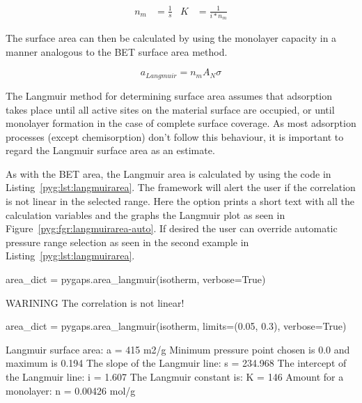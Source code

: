 \begin{align}
	n_m & = \frac{1}{s} & K & = \frac{1}{i * n_m}
\end{align}

The surface area can then be calculated by using the monolayer
capacity in a manner analogous to the BET surface area method.

\begin{equation}
	a_{Langmuir} = n_m A_N \sigma
\end{equation}

The Langmuir method for determining surface area assumes that
adsorption takes place until all active sites on the material
surface are occupied, or until monolayer formation in the
case of complete surface coverage. As most adsorption processes
(except chemisorption) don't follow this behaviour, it is
important to regard the Langmuir surface area as an estimate.

As with the BET area, the Langmuir area is calculated by using the code in
Listing~\ref{pyg:lst:langmuirarea}. The framework will alert the user
if the correlation is not linear in the selected range.
Here the  option prints a short
text with all the calculation variables and the graphs the
Langmuir plot as seen in Figure~\ref{pyg:fgr:langmuirarea-auto}.
If desired the user can override
automatic pressure range selection as seen in the second example in
Listing~\ref{pyg:lst:langmuirarea}.

\begin{samepage}
	\begin{python}[caption={Calculating a Langmuir area},label={pyg:lst:langmuirarea}]
area_dict = pygaps.area_langmuir(isotherm, verbose=True)
\end{python}
	\begin{pythonout}
WARINING The correlation is not linear!
\end{pythonout}
	\begin{python}
area_dict = pygaps.area_langmuir(isotherm, 
                                 limits=(0.05, 0.3), 
                                 verbose=True)
\end{python}
	\begin{pythonout}
Langmuir surface area: 	a = 415 m2/g
Minimum pressure point chosen is 0.0 and maximum is 0.194
The slope of the Langmuir line: 		s = 234.968
The intercept of the Langmuir line: 	i = 1.607
The Langmuir constant is:				K = 146
Amount for a monolayer: 				n = 0.00426 mol/g
\end{pythonout}
\end{samepage}

